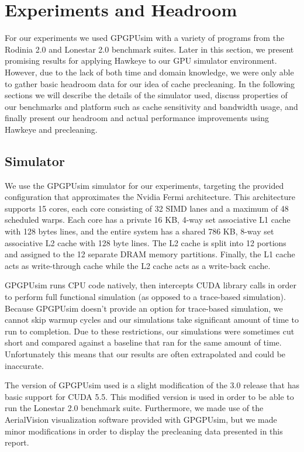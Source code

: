 \chapter{Experiments and Headroom}

For our experiments we used GPGPUsim with a variety of programs from the Rodinia 2.0 \cite{rodinia} and Lonestar 2.0 \cite{lonestar} benchmark suites. Later in this section, we present promising results for applying Hawkeye to our GPU simulator environment. However, due to the lack of both time and domain knowledge, we were only able to gather basic headroom data for our idea of cache precleaning. In the following sections we will describe the details of the simulator used, discuss properties of our benchmarks and platform such as cache sensitivity and bandwidth usage, and finally present our headroom and actual performance improvements using Hawkeye and precleaning.

\section{Simulator}
We use the GPGPUsim \cite{gpgpusim} simulator for our experiments, targeting the provided configuration that approximates the Nvidia Fermi architecture. This architecture supports 15 cores, each core consisting of 32 SIMD lanes and a maximum of 48 scheduled warps. Each core has a private 16 KB, 4-way set associative L1 cache with 128 bytes lines, and the entire system has a shared 786 KB, 8-way set associative L2 cache with 128 byte lines. The L2 cache is split into 12 portions and assigned to the 12 separate DRAM memory partitions. Finally, the L1 cache acts as write-through cache while the L2 cache acts as a write-back cache.

GPGPUsim runs CPU code natively, then intercepts CUDA library calls in order to perform full functional simulation (as opposed to a trace-based simulation). Because GPGPUsim doesn’t provide an option for trace-based simulation, we cannot skip warmup cycles and our simulations take significant amount of time to run to completion. Due to these restrictions, our simulations were sometimes cut short and compared against a baseline that ran for the same amount of time. Unfortunately this means that our results are often extrapolated and could be inaccurate.

The version of GPGPUsim used is a slight modification of the 3.0 release that has basic support for CUDA 5.5. This modified version is used in order to be able to run the Lonestar 2.0 benchmark suite. Furthermore, we made use of the AerialVision \cite{aerialvision} visualization software provided with GPGPUsim, but we made minor modifications in order to display the precleaning data presented in this report.

